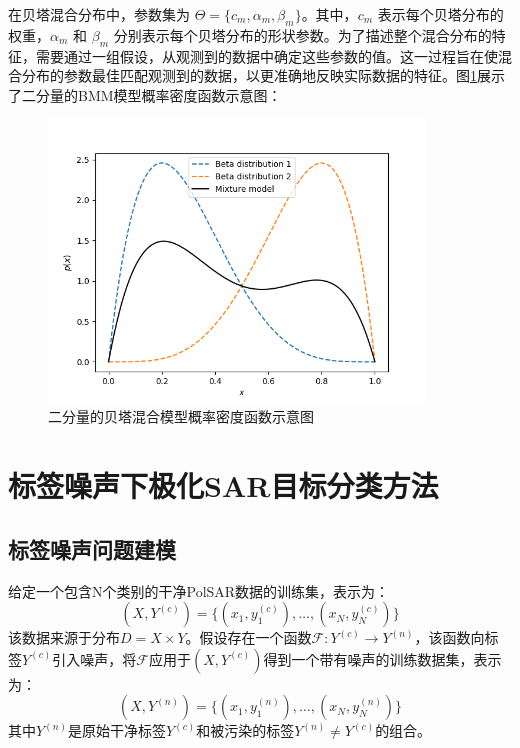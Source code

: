 在贝塔混合分布中，参数集为 $\Theta = \{c_m, \alpha_m, \beta_m\}$。其中，$c_m$ 表示每个贝塔分布的权重，$\alpha_m$ 和 $\beta_m$ 分别表示每个贝塔分布的形状参数。为了描述整个混合分布的特征，需要通过一组假设，从观测到的数据中确定这些参数的值。这一过程旨在使混合分布的参数最佳匹配观测到的数据，以更准确地反映实际数据的特征。图\ref{BMM}展示了二分量的BMM模型概率密度函数示意图：

\begin{figure}[ht!]
    \centering
    \includegraphics[width=10cm]{pic/chapter4/BMM.png}
    \caption{二分量的贝塔混合模型概率密度函数示意图}
    \label{BMM}
\end{figure}

\section{标签噪声下极化SAR目标分类方法}
\subsection{标签噪声问题建模}
给定一个包含N个类别的干净PolSAR数据的训练集，表示为：
\begin{equation}
    (X, Y^{(c)})=\{(x_1,y_1^{(c)}),\ldots,(x_N,y_N^{(c)})\}
\end{equation}
该数据来源于分布$D=X \times Y$。假设存在一个函数$\mathcal{F}:Y^{(c)} \rightarrow Y^{(n)}$，该函数向标签$Y^{(c)}$引入噪声，将$\mathcal{F}$应用于$(X, Y^{(c)})$得到一个带有噪声的训练数据集，表示为：
\begin{equation}
    (X, Y^{(n)})=\{(x_1,y_1^{(n)}),\ldots,(x_N,y_N^{(n)})\}
\end{equation}
其中$Y^{(n)}$是原始干净标签$Y^{(c)}$和被污染的标签$Y^{(n)} \neq Y^{(c)}$的组合。

